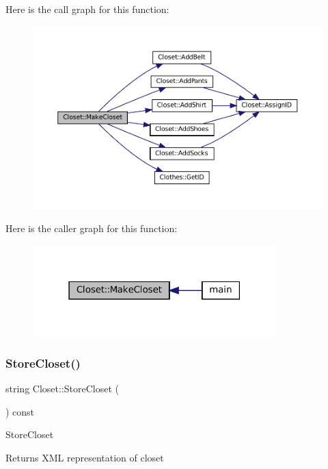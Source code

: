 Here is the call graph for this function\+:
\nopagebreak
\begin{figure}[H]
\begin{center}
\leavevmode
\includegraphics[width=350pt]{classCloset_a1b904dfcdafe293f3f530b338afc0601_cgraph}
\end{center}
\end{figure}
Here is the caller graph for this function\+:
\nopagebreak
\begin{figure}[H]
\begin{center}
\leavevmode
\includegraphics[width=267pt]{classCloset_a1b904dfcdafe293f3f530b338afc0601_icgraph}
\end{center}
\end{figure}
\mbox{\label{classCloset_a1f2ec8e3e912756e35fdc55c9401ea3e}} 
\subsubsection{\texorpdfstring{Store\+Closet()}{StoreCloset()}}
{\footnotesize\ttfamily string Closet\+::\+Store\+Closet (\begin{DoxyParamCaption}{ }\end{DoxyParamCaption}) const}

Store\+Closet \begin{DoxyReturn}{Returns}
X\+ML representation of closet 
\end{DoxyReturn}


